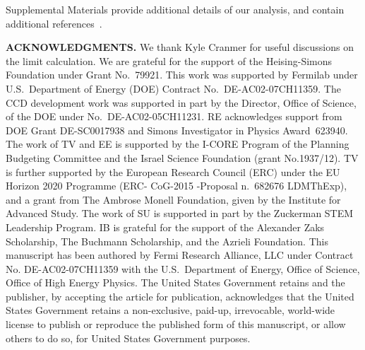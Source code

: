 \documentclass[aps,prl,twocolumn,showpacs,superscriptaddress,preprintnumbers]{revtex4-1}
\begin{document}
Supplemental Materials provide additional details of our analysis, and contain additional references~\cite{janesick2001scientific,Haro:2016,Spurious-charge,Holland:2003,Aguilar-Arevalo:2016ndq, CONNIE_2019,Haro_2020,Bernstein:2017gsy,69907,Holland:2003,KRISHNAMOORTHY200423}.

\begin{acknowledgments}
\noindent\textbf{ACKNOWLEDGMENTS.}
We thank Kyle Cranmer for useful discussions on the limit calculation.  We are grateful for the support of the Heising-Simons Foundation under Grant No.~79921.
This work was supported by Fermilab under U.S.~Department of Energy (DOE) Contract No.~DE-AC02-07CH11359. 
The CCD development work was supported in part by the Director, Office of Science, of the DOE under No.~DE-AC02-05CH11231. RE acknowledges support from DOE Grant DE-SC0017938 and Simons Investigator in Physics Award~623940. 
The work of TV and EE is supported by the I-CORE Program of the Planning Budgeting Committee and the Israel Science Foundation (grant No.1937/12). TV is further supported  by the European Research Council (ERC) under the EU Horizon 2020 Programme (ERC- CoG-2015 -Proposal n.~682676 LDMThExp), and a grant from The Ambrose Monell Foundation, given by the Institute for Advanced Study.
The work of SU is supported in part by the Zuckerman STEM Leadership Program.
IB is grateful for the support of the Alexander Zaks Scholarship, The Buchmann Scholarship, and the Azrieli Foundation.
This manuscript has been authored by Fermi Research Alliance, LLC under Contract No. DE-AC02-07CH11359 with the U.S.~Department of Energy, Office of Science, Office of High Energy Physics. The United States Government retains and the publisher, by accepting the article for publication, acknowledges that the United States Government retains a non-exclusive, paid-up, irrevocable, world-wide license to publish or reproduce the published form of this manuscript, or allow others to do so, for United States Government purposes.
\end{acknowledgments}




 
\clearpage
\end{document}
